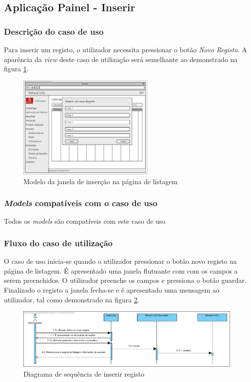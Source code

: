 \subsection{Aplicação Painel - Inserir}
\subsubsection*{Descrição do caso de uso}
Para inserir um registo, o utilizador necessita pressionar o botão \textit{Novo Registo}. A aparência da \textit{view} deste caso de utilização será semelhante ao demonstrado na figura \ref{fig:di_novo}. 

\begin{figure}[H] 
	\begin{center}
		\includegraphics[width=0.60\textwidth,keepaspectratio]{figuras/Diagramas_vp/DI_Painel_2_Inserir.jpg}
		\caption{Modelo da janela de inserção na página de listagem}
		\label{fig:di_novo} 
	\end{center}
\end{figure}

\subsubsection*{\textit{Models} compatíveis com o caso de uso}
Todos os \textit{models} são compatíveis com este caso de uso

\subsubsection*{Fluxo do caso de utilização}
O caso de uso inicia-se quando o utilizador pressionar o botão novo registo na página de listagem. É apresentado uma janela flutuante com com os campos a serem preenchidos. O utilizador preenche os campos e pressiona o botão guardar. Finalizado o registo a janela fecha-se e é apresentado uma mensagem ao utilizador, tal como demonstrado na figura \ref{fig:sd_novo}.


\begin{figure}[H] 
	\begin{center}
		\includegraphics[width=\textwidth,keepaspectratio]{figuras/Diagramas_vp/SD_Painel_2_Inserir.jpg}
		\caption{Diagrama de sequência de inserir registo}
		\label{fig:sd_novo} 
	\end{center}
\end{figure}